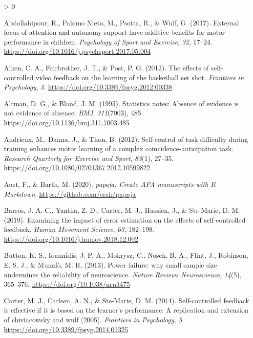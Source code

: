 \documentclass[
  english,
  jou]{apa7}
\newlength{\cslhangindent}
\newenvironment{CSLReferences}[2] %
 {%
  \setlength{\parindent}{0pt}
  \ifodd #1 \everypar{\setlength{\hangindent}{\cslhangindent}}\ignorespaces\fi
  \ifnum #2 > 0
  \setlength{\parskip}{#2\baselineskip}
  \fi
 }%
 {}
\begin{document}
\hypertarget{refs}{}
\begin{CSLReferences}{1}{0}
\leavevmode\hypertarget{ref-abdollahipour2017}{}%
Abdollahipour, R., Palomo Nieto, M., Psotta, R., \& Wulf, G. (2017). External focus of attention and autonomy support have additive benefits for motor performance in children. \emph{Psychology of Sport and Exercise}, \emph{32}, 17--24. \url{https://doi.org/10.1016/j.psychsport.2017.05.004}

\leavevmode\hypertarget{ref-aiken2012}{}%
Aiken, C. A., Fairbrother, J. T., \& Post, P. G. (2012). The effects of self-controlled video feedback on the learning of the basketball set shot. \emph{Frontiers in Psychology}, \emph{3}. \url{https://doi.org/10.3389/fpsyg.2012.00338}

\leavevmode\hypertarget{ref-altman1995}{}%
Altman, D. G., \& Bland, J. M. (1995). Statistics notes: Absence of evidence is not evidence of absence. \emph{BMJ}, \emph{311}(7003), 485. \url{https://doi.org/10.1136/bmj.311.7003.485}

\leavevmode\hypertarget{ref-andrieux2012}{}%
Andrieux, M., Danna, J., \& Thon, B. (2012). Self-control of task difficulty during training enhances motor learning of a complex coincidence-anticipation task. \emph{Research Quarterly for Exercise and Sport}, \emph{83}(1), 27--35. \url{https://doi.org/10.1080/02701367.2012.10599822}

\leavevmode\hypertarget{ref-R-papaja}{}%
Aust, F., \& Barth, M. (2020). \emph{{papaja}: {Create} {APA} manuscripts with {R Markdown}}. \url{https://github.com/crsh/papaja}

\leavevmode\hypertarget{ref-barros2019}{}%
Barros, J. A. C., Yantha, Z. D., Carter, M. J., Hussien, J., \& Ste-Marie, D. M. (2019). Examining the impact of error estimation on the effects of self-controlled feedback. \emph{Human Movement Science}, \emph{63}, 182--198. \url{https://doi.org/10.1016/j.humov.2018.12.002}

\leavevmode\hypertarget{ref-button2013}{}%
Button, K. S., Ioannidis, J. P. A., Mokrysz, C., Nosek, B. A., Flint, J., Robinson, E. S. J., \& Munafò, M. R. (2013). Power failure: why small sample size undermines the reliability of neuroscience. \emph{Nature Reviews Neuroscience}, \emph{14}(5), 365--376. \url{https://doi.org/10.1038/nrn3475}

\leavevmode\hypertarget{ref-carter2014}{}%
Carter, M. J., Carlsen, A. N., \& Ste-Marie, D. M. (2014). Self-controlled feedback is effective if it is based on the learner{'}s performance: A replication and extension of chiviacowsky and wulf (2005). \emph{Frontiers in Psychology}, \emph{5}. \url{https://doi.org/10.3389/fpsyg.2014.01325}


\end{CSLReferences}
\end{document}
